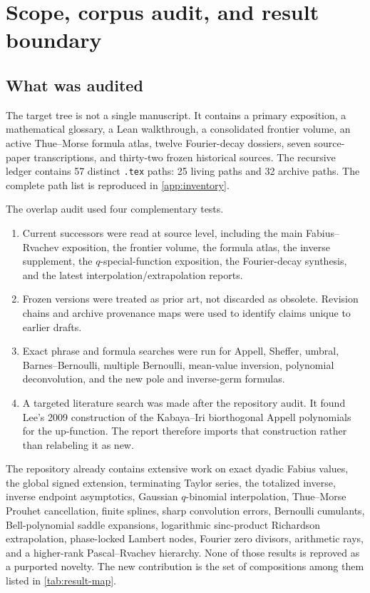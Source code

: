 \documentclass[11pt,oneside]{article}
\theoremstyle{frontier}
\theoremstyle{definition}
\theoremstyle{remark}
\begin{document}
\begingroup
\footnotesize
\setlength{\parskip}{0pt}
\tableofcontents
\endgroup
\clearpage
{}

\section{Scope, corpus audit, and result boundary}
\label{sec:scope}

\subsection{What was audited}

The target tree is not a single manuscript.  It contains a primary exposition, a mathematical
glossary, a Lean walkthrough, a consolidated frontier volume, an active Thue--Morse formula atlas,
twelve Fourier-decay dossiers, seven source-paper transcriptions, and thirty-two frozen historical
sources.  The recursive ledger contains 57 distinct \texttt{.tex} paths: 25 living paths and 32 archive
paths.  The complete path list is reproduced in \cref{app:inventory}.

The overlap audit used four complementary tests.
\begin{enumerate}
\item Current successors were read at source level, including the main Fabius--Rvachev exposition,
      the frontier volume, the formula atlas, the inverse supplement, the $q$-special-function
      exposition, the Fourier-decay synthesis, and the latest interpolation/extrapolation reports.
\item Frozen versions were treated as prior art, not discarded as obsolete.  Revision chains and
      archive provenance maps were used to identify claims unique to earlier drafts.
\item Exact phrase and formula searches were run for Appell, Sheffer, umbral, Barnes--Bernoulli,
      multiple Bernoulli, mean-value inversion, polynomial deconvolution, and the new pole and
      inverse-germ formulas.
\item A targeted literature search was made after the repository audit.  It found Lee's 2009
      construction of the Kabaya--Iri biorthogonal Appell polynomials for the up-function.  The
      report therefore imports that construction rather than relabeling it as new.
\end{enumerate}

\begin{statusbox}
The repository already contains extensive work on exact dyadic Fabius values, the global signed
extension, terminating Taylor series, the totalized inverse, inverse endpoint asymptotics, Gaussian
$q$-binomial interpolation, Thue--Morse Prouhet cancellation, finite splines, sharp convolution
errors, Bernoulli cumulants, Bell-polynomial saddle expansions, logarithmic sinc-product
Richardson extrapolation, phase-locked Lambert nodes, Fourier zero divisors, arithmetic rays, and a
higher-rank Pascal--Rvachev hierarchy.  None of those results is reproved as a purported novelty.
The new contribution is the set of compositions among them listed in \cref{tab:result-map}.
\end{statusbox}
\end{document}
